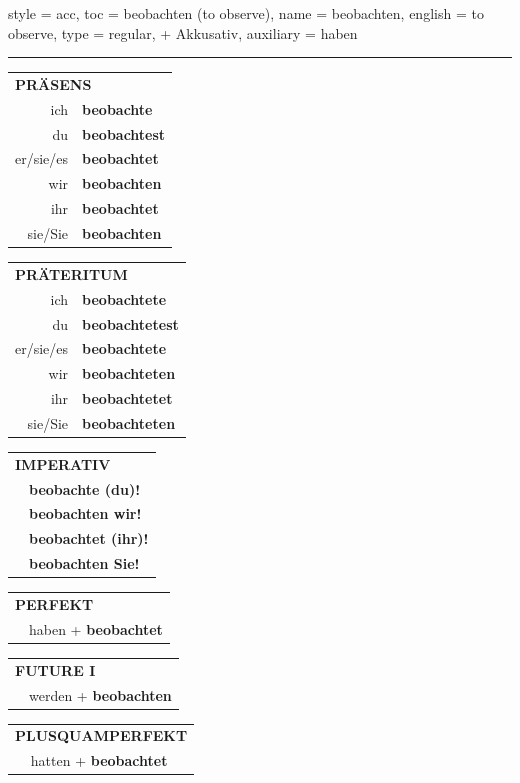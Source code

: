 \begin{verbentry}{
  style = {acc},
  toc = {beobachten (to observe)},
  name = {beobachten},
  english = {to observe},
  type = {regular, + Akkusativ},
  auxiliary = {haben}
}
 

\vspace{5pt}
\hrule
\vspace{5pt}

\begin{tabular}{rl}
\multicolumn{2}{l}{\textbf{PRÄSENS}}\\
ich & \textbf{beobachte}\\
du & \textbf{beobachtest}\\
er/sie/es & \textbf{beobachtet}\\
wir & \textbf{beobachten}\\
ihr & \textbf{beobachtet}\\
sie/Sie & \textbf{beobachten}\\
\end{tabular}
\hfill
\begin{tabular}{rl}
\multicolumn{2}{l}{\textbf{PRÄTERITUM}}\\
ich & \textbf{beobachtete}\\
du & \textbf{beobachtetest}\\
er/sie/es & \textbf{beobachtete}\\
wir & \textbf{beobachteten}\\
ihr & \textbf{beobachtetet}\\
sie/Sie & \textbf{beobachteten}\\
\end{tabular}
\hfill
\begin{tabular}{rl}
\multicolumn{2}{l}{\textbf{IMPERATIV}}\\
& \textbf{beobachte (du)!}\\
& \textbf{beobachten wir!}\\
& \textbf{beobachtet (ihr)!}\\
& \textbf{beobachten Sie!}\\
\end{tabular}

\vspace{10pt}

\begin{tabular}{rl}
\multicolumn{2}{l}{\textbf{PERFEKT}}\\
& haben + \textbf{beobachtet}\\
\end{tabular}
\hfill
\begin{tabular}{rl}
\multicolumn{2}{l}{\textbf{FUTURE I}}\\
& werden + \textbf{beobachten}\\
\end{tabular}
\hfill
\begin{tabular}{rl}
\multicolumn{2}{l}{\textbf{PLUSQUAMPERFEKT}}\\
& hatten + \textbf{beobachtet}\\
\end{tabular}


\end{verbentry}
